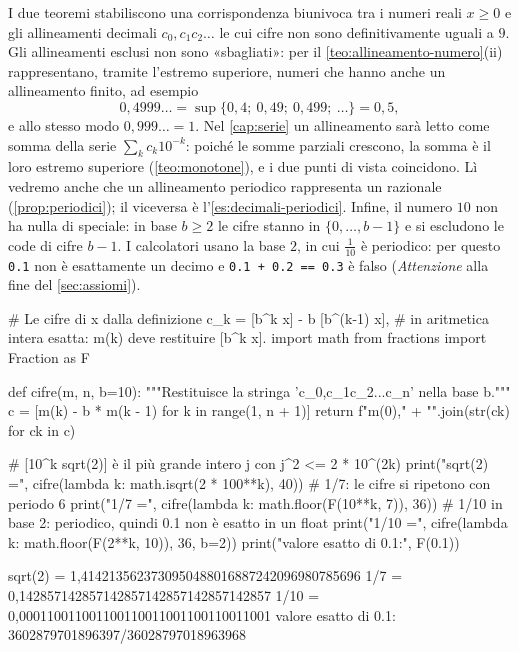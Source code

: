 \begin{osservazione}\label{oss:allineamenti-nove}
I due teoremi stabiliscono una corrispondenza biunivoca tra i numeri reali $x\ge0$ e gli
allineamenti decimali $c_{0}{,}c_{1}c_{2}\ldots$ le cui cifre non sono definitivamente
uguali a $9$. Gli allineamenti esclusi non sono «sbagliati»: per il
\cref{teo:allineamento-numero}(ii) rappresentano, tramite l'estremo superiore, numeri che
hanno anche un allineamento finito, ad esempio
\[
  0{,}4999\ldots=\sup\{0{,}4;\ 0{,}49;\ 0{,}499;\ \dots\}=0{,}5 ,
\]
e allo stesso modo $0{,}999\ldots=1$. Nel \cref{cap:serie} un allineamento sarà letto
come somma della serie $\sum_{k}c_{k}10^{-k}$: poiché le somme parziali crescono, la somma
è il loro estremo superiore (\cref{teo:monotone}), e i due punti di vista coincidono. Lì
vedremo anche che un allineamento periodico rappresenta un razionale
(\cref{prop:periodici}); il viceversa è l'\cref{es:decimali-periodici}. Infine, il numero
$10$ non ha nulla di speciale: in base $b\ge2$ le cifre stanno in $\{0,\dots,b-1\}$ e si
escludono le code di cifre $b-1$. I calcolatori usano la base $2$, in cui $\frac1{10}$ è
periodico: per questo \texttt{0.1} non è esattamente un decimo e
\texttt{0.1 + 0.2 == 0.3} è falso (\emph{Attenzione} alla fine del \cref{sec:assiomi}).
\end{osservazione}

\begin{python}
# Le cifre di x dalla definizione c_k = [b^k x] - b [b^(k-1) x],
# in aritmetica intera esatta: m(k) deve restituire [b^k x].
import math
from fractions import Fraction as F

def cifre(m, n, b=10):
    """Restituisce la stringa 'c_0,c_1c_2...c_n' nella base b."""
    c = [m(k) - b * m(k - 1) for k in range(1, n + 1)]
    return f"{m(0)}," + "".join(str(ck) for ck in c)

# [10^k sqrt(2)] è il più grande intero j con j^2 <= 2 * 10^(2k)
print("sqrt(2) =", cifre(lambda k: math.isqrt(2 * 100**k), 40))
# 1/7: le cifre si ripetono con periodo 6
print("1/7     =", cifre(lambda k: math.floor(F(10**k, 7)), 36))
# 1/10 in base 2: periodico, quindi 0.1 non è esatto in un float
print("1/10    =", cifre(lambda k: math.floor(F(2**k, 10)), 36, b=2))
print("valore esatto di 0.1:", F(0.1))
\end{python}
\begin{risultato}
sqrt(2) = 1,4142135623730950488016887242096980785696
1/7     = 0,142857142857142857142857142857142857
1/10    = 0,000110011001100110011001100110011001
valore esatto di 0.1: 3602879701896397/36028797018963968
\end{risultato}

